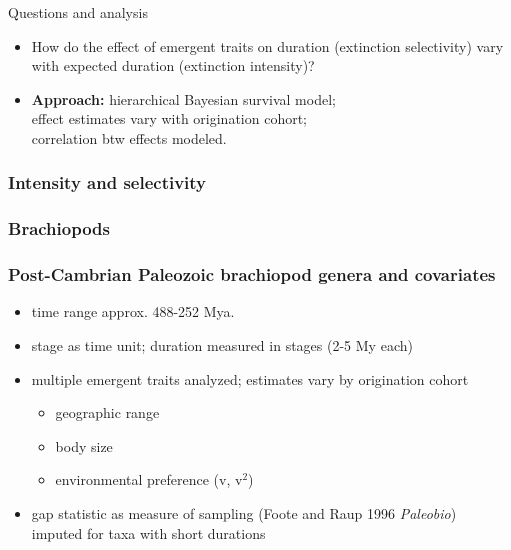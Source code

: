 \documentclass{beamer}
\begin{document}
\begin{frame}
  \begin{alertblock}{Questions and analysis}
    \begin{itemize}
      \item How do the effect of emergent traits on duration (\alert{extinction selectivity}) vary with expected duration (\alert{extinction intensity})?
      \item \textbf{Approach:} hierarchical Bayesian survival model; \\effect estimates vary with origination cohort; \\correlation btw effects modeled.
    \end{itemize}
  \end{alertblock}
\end{frame}

\begin{frame}
  \frametitle{Intensity and selectivity}
  \begin{center}
  \end{center}
\end{frame}

\begin{frame}
  \frametitle{Brachiopods}

  \tiny{}
\end{frame}

\begin{frame}
  \frametitle{Post-Cambrian Paleozoic brachiopod genera and covariates}
  \begin{itemize}
    \item time range approx. 488-252 Mya.
    \item stage as time unit; duration measured in stages (2-5 My each)
    \item multiple emergent traits analyzed; estimates vary by origination cohort
      \begin{itemize}
        \item geographic range
        \item body size
        \item environmental preference (v, v\(^2\))
      \end{itemize}
    \item gap statistic as measure of sampling {\footnotesize{(Foote and Raup 1996 \textit{Paleobio})}} \\imputed for taxa with short durations
  \end{itemize}
\end{frame}
\end{document}
